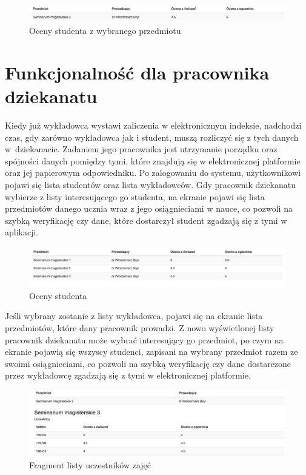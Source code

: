 \documentclass{xmgr}
\begin{document}
\begin{figure}[th!]
\centering
\includegraphics[width=0.7\hsize]{images/studentGrade}
\caption{Oceny studenta z wybranego przedmiotu\label{RYS.12}}
\end{figure}

\section{Funkcjonalność dla pracownika dziekanatu}
\indent \indent \indent Kiedy już wykładowca wystawi zaliczenia w elektronicznym indeksie, nadchodzi czas, gdy zarówno wykładowca jak i student, muszą rozliczyć się z tych danych w~dziekanacie. Zadaniem jego pracownika jest utrzymanie porządku oraz spójności danych pomiędzy tymi, które znajdują się w elektronicznej platformie oraz jej papierowym odpowiedniku. Po zalogowaniu do systemu, użytkownikowi pojawi się lista studentów oraz lista wykładowców. Gdy pracownik dziekanatu  wybierze z listy interesującego go studenta, na ekranie pojawi się lista przedmiotów danego ucznia wraz z jego osiągnieciami w nauce, co pozwoli na szybką weryfikację czy dane, które dostarczył student zgadzają się z tymi w aplikacji.

\begin{figure}[th!]
\centering
\includegraphics[width=0.7\hsize]{images/studentGrades}
\caption{Oceny studenta\label{RYS.13}}
\end{figure}

\noindent Jeśli wybrany zostanie z listy wykładowca, pojawi się na ekranie lista przedmiotów, które dany pracownik prowadzi. Z nowo wyświetlonej listy pracownik dziekanatu może wybrać interesujący go przedmiot, po czym na ekranie pojawią się wszyscy studenci, zapisani na wybrany przedmiot razem ze swoimi osiągnieciami, co pozwoli na szybką weryfikację czy dane dostarczone przez wykładowcę zgadzają się z tymi w elektronicznej platformie.

 \begin{figure}[th!]
\centering
\includegraphics[width=0.61\hsize]{images/deaneryList}
\caption{Fragment listy uczestników zajęć\label{RYS.14}}
\end{figure}
\end{document}
